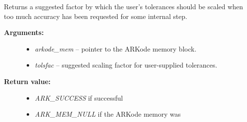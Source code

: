 \documentclass[letterpaper,10pt,english]{sphinxmanual}
\begin{document}

\begin{fulllineitems}
\label{c_interface/User_callable:ARKodeGetTolScaleFactor}
Returns a suggested factor by which the user's
tolerances should be scaled when too much accuracy has been
requested for some internal step.
\begin{description}
\item[{\textbf{Arguments:}}] \leavevmode\begin{itemize}
\item {} 
\emph{arkode\_mem} -- pointer to the ARKode memory block.

\item {} 
\emph{tolsfac} -- suggested scaling factor for user-supplied tolerances.

\end{itemize}

\item[{\textbf{Return value:}}] \leavevmode\begin{itemize}
\item {} 
\emph{ARK\_SUCCESS} if successful

\item {} 
\emph{ARK\_MEM\_NULL} if the ARKode memory was 

\end{itemize}

\end{description}

\end{fulllineitems}

\end{document}
